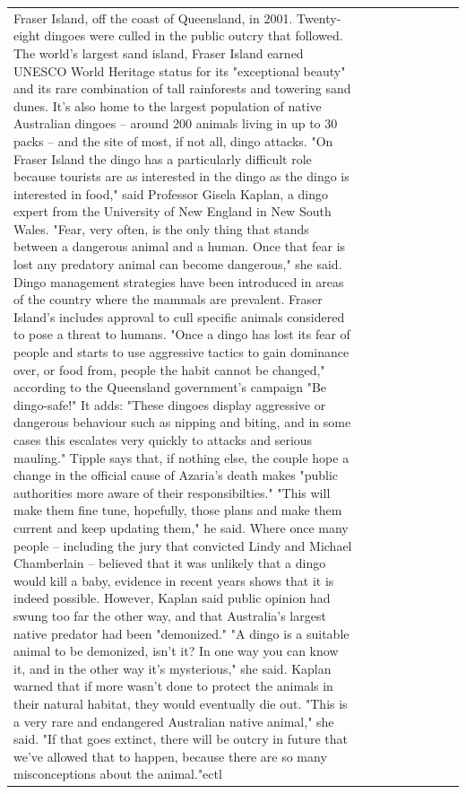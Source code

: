 \begin{table}[H]
\begin{tabular}{lllrlllll}
Fraser Island, off the coast of Queensland, in 2001. Twenty-eight dingoes were culled in the public outcry that followed. The world's largest sand island, Fraser Island earned UNESCO World Heritage status for its "exceptional beauty" and its rare combination of tall rainforests and towering sand dunes. It's also home to the largest population of native Australian dingoes -- around 200 animals living in up to 30 packs -- and the site of most, if not all, dingo attacks. "On Fraser Island the dingo has a particularly difficult role because tourists are as interested in the dingo as the dingo is interested in food," said Professor Gisela Kaplan, a dingo expert from the University of New England in New South Wales. "Fear, very often, is the only thing that stands between a dangerous animal and a human. Once that fear is lost any predatory animal can become dangerous," she said. Dingo management strategies have been introduced in areas of the country where the mammals are prevalent. Fraser Island's includes approval to cull specific animals considered to pose a threat to humans. "Once a dingo has lost its fear of people and starts to use aggressive tactics to gain dominance over, or food from, people the habit cannot be changed," according to the Queensland government's campaign "Be dingo-safe!" It adds: "These dingoes display aggressive or dangerous behaviour such as nipping and biting, and in some cases this escalates very quickly to attacks and serious mauling." Tipple says that, if nothing else, the couple hope a change in the official cause of Azaria's death makes "public authorities more aware of their responsibilties." "This will make them fine tune, hopefully, those plans and make them current and keep updating them," he said. Where once many people -- including the jury that convicted Lindy and Michael Chamberlain -- believed that it was unlikely that a dingo would kill a baby, evidence in recent years shows that it is indeed possible. However, Kaplan said public opinion had swung too far the other way, and that Australia's largest native predator had been "demonized." "A dingo is a suitable animal to be demonized, isn't it? In one way you can know it, and in the other way it's mysterious," she said. Kaplan warned that if more wasn't done to protect the animals in their natural habitat, they would eventually die out. "This is a very rare and endangered Australian native animal," she said. "If that goes extinct, there will be outcry in future that we've allowed that to happen, because there are so many misconceptions about the animal."ectl \\

\end{tabular}
\end{table}
